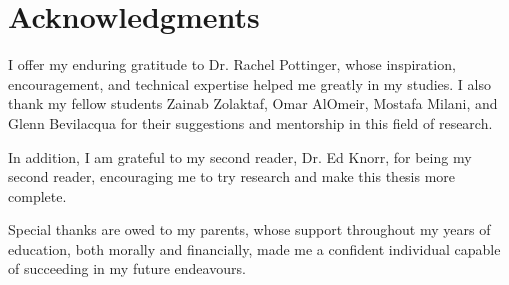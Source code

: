 
\chapter{Acknowledgments}

I offer my enduring gratitude to Dr. Rachel Pottinger, whose inspiration, encouragement, and technical expertise helped me greatly in my studies. I also thank my fellow students Zainab Zolaktaf, Omar AlOmeir, Mostafa Milani, and Glenn Bevilacqua for their suggestions and mentorship in this field of research.

In addition, I am grateful to my second reader, Dr. Ed Knorr, for being my second reader, encouraging me to try research and make this thesis more complete.

Special thanks are owed to my parents, whose support throughout my years of education, both morally and financially, made me a confident individual capable of succeeding in my future endeavours.
\endinput